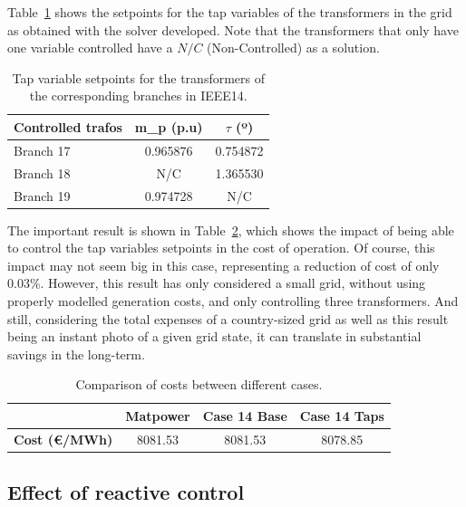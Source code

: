Table~\ref{tab:tap_setpoints} shows the setpoints for the tap variables of the transformers in the grid as obtained with the solver developed. Note that the transformers that only have one variable controlled have a $N/C$ (Non-Controlled) as a solution.

\begin{table}[H]
    \centering
    \caption{Tap variable setpoints for the transformers of the corresponding branches in IEEE14.}
    \begin{tabular}{lcc}
    \hline
    \textbf{Controlled trafos} & \textbf{m\_p (p.u)} & \textbf{$\tau$ (º)} \\ \hline\hline
    Branch 17                  & 0.965876            & 0.754872          \\ 
    Branch 18                  & N/C                 & 1.365530          \\ 
    Branch 19                  & 0.974728            & N/C                \\ \hline
    \end{tabular}
    
    \label{tab:tap_setpoints}
\end{table}

The important result is shown in Table~\ref{tab:costs_tap}, which shows the impact of being able to control the tap variables setpoints in the cost of operation. Of course, this impact may not seem big in this case, representing
a reduction of cost of only 0.03\%. However, this result has only considered a small grid, without using properly modelled generation costs, and only controlling three transformers. And still, considering the total expenses of a country-sized grid as well as this result
being an instant photo of a given grid state, it can translate in substantial savings in the long-term. 

\begin{table}[H]
    \centering
    \caption{Comparison of costs between different cases.}
    \begin{tabular}{lccc}
    \hline
                          & \textbf{Matpower} & \textbf{Case 14 Base} & \textbf{Case 14 Taps} \\ \hline\hline
    \textbf{Cost (€/MWh)} & 8081.53           & 8081.53                  & 8078.85               \\ \hline
    \end{tabular}
    \label{tab:costs_tap}
    \end{table}
    

\subsection{Effect of reactive control}


